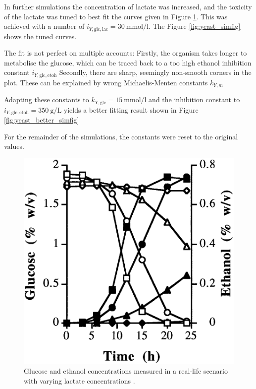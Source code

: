 		In further simulations the concentration of lactate was increased, and the toxicity of the lactate was tuned to best fit the curves given in Figure \ref{fig:yeast_real}.
		This was achieved with a number of $i_{Y,\mathrm{glc,lac}}=\SI{30}{\milli\mole\per\litre}$. The Figure \ref{fig:yeast_simfig} shows the tuned curves.
		
		The fit is not perfect on multiple accounts: Firstly, the organism takes longer to metabolise the glucose, which can be traced back to a too high ethanol inhibition constant $i_{Y,\mathrm{glc,etoh}}$
		Secondly, there are sharp, seemingly non-smooth corners in the plot. These can be explained by wrong Michaelis-Menten constants $k_{Y,m}$
		
		Adapting these constants to $k_{Y,\mathrm{glc}}=\SI{15}{\milli\mole\per\litre}$ and the inhibition constant to $i_{Y,\mathrm{glc,etoh}}=\SI{350}{\gram\per\liter}$ yields a better fitting result
		shown in Figure \ref{fig:yeast_better_simfig}
		
		For the remainder of the simulations, the constants were reset to the original values.
		
		\begin{figure}[h]
			\centering
			\includegraphics[width=0.6\linewidth]{figures/yeast_real.png}
			\caption{Glucose and ethanol concentrations measured in a real-life scenario with varying lactate concentrations \cite{Narendranath2001}. }
			\label{fig:yeast_real}
		\end{figure}
		
